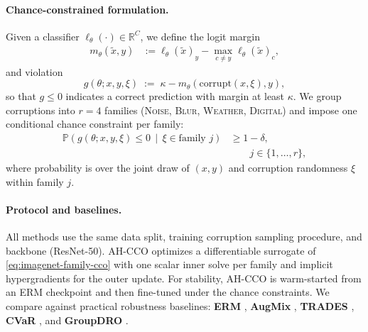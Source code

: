\documentclass{uai2026} %
\theoremstyle{plain}
\theoremstyle{definition}
\begin{document}
\paragraph{Chance-constrained formulation.}
Given a classifier $\ell_\theta(\cdot)\in\mathbb{R}^C$, we define the logit margin
\begin{equation}
\begin{aligned}
  m_\theta(\widetilde x,y)
  &:= \ell_\theta(\widetilde x)_y
  - \max_{c\neq y}\ell_\theta(\widetilde x)_c,
\end{aligned}
\end{equation}
and violation
\begin{equation}
  g(\theta; x,y,\xi)
  \;:=\;
  \kappa - m_\theta(\mathrm{corrupt}(x,\xi),y),
  \label{eq:imagenet-violation}
\end{equation}
so that $g\le 0$ indicates a correct prediction with margin at least $\kappa$.
We group corruptions into $r=4$ families (\textsc{Noise}, \textsc{Blur}, \textsc{Weather}, \textsc{Digital}) and impose one conditional chance constraint per family:
\begin{equation}
\begin{aligned}
  \mathbb{P}\!\left(
    g(\theta;x,y,\xi)\le 0 \,\middle|\, \xi\in\text{family } j
  \right)
  &\ge 1-\delta,\\
  &\qquad j\in\{1,\dots,r\},
  \label{eq:imagenet-family-cco}
\end{aligned}
\end{equation}
where probability is over the joint draw of $(x,y)$ and corruption randomness $\xi$ within family $j$.

\paragraph{Protocol and baselines.}
All methods use the same data split, training corruption sampling procedure, and backbone (ResNet-50).
AH-CCO optimizes a differentiable surrogate of \eqref{eq:imagenet-family-cco} with one scalar inner solve per family and implicit hypergradients for the outer update.
For stability, AH-CCO is warm-started from an ERM checkpoint and then fine-tuned under the chance constraints.
We compare against practical robustness baselines: \textbf{ERM} \citep{goodfellow2016deep}, \textbf{AugMix} \citep{hendrycks2020augmix}, \textbf{TRADES} \citep{zhang2019theoretically}, \textbf{CVaR} \citep{rockafellaruryasev2000cvar}, and \textbf{GroupDRO} \citep{sagawa2020distributionally}.
\end{document}
